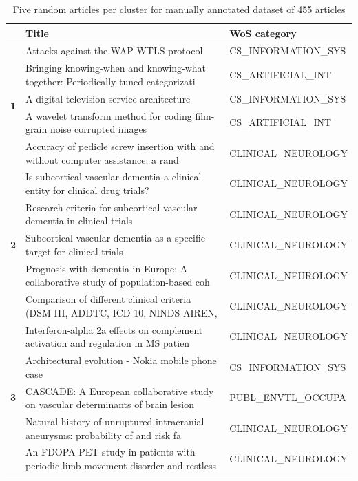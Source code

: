 \begin{table}
\begin{tabular}{|c|p{6.5cm}|p{4.7cm}|} 
\hline %
\textbf{ } & \textbf{Title} & \textbf{WoS category} \\ 
\hline 
\multirow{ 5}{*}{\textbf{1}} & Attacks against the WAP WTLS protocol & CS\_INFORMATION\_SYS \\
& Bringing knowing-when and knowing-what together: Periodically tuned categorizati & CS\_ARTIFICIAL\_INT  \\
& A digital television service architecture & CS\_INFORMATION\_SYS  \\ 
& A wavelet transform method for coding film-grain noise corrupted images & CS\_ARTIFICIAL\_INT  \\ 
& Accuracy of pedicle screw insertion with and without computer assistance: a rand & CLINICAL\_NEUROLOGY  \\
\hline
\hline 
\multirow{ 5}{*}{\textbf{2}} & Is subcortical vascular dementia a clinical entity for clinical drug trials? & CLINICAL\_NEUROLOGY \\
& Research criteria for subcortical vascular dementia in clinical trials & CLINICAL\_NEUROLOGY \\
& Subcortical vascular dementia as a specific target for clinical trials & CLINICAL\_NEUROLOGY \\ 
& Prognosis with dementia in Europe: A collaborative study of population-based coh & CLINICAL\_NEUROLOGY \\ 
& Comparison of different clinical criteria (DSM-III, ADDTC, ICD-10, NINDS-AIREN, & CLINICAL\_NEUROLOGY \\
\hline
\hline 
\multirow{ 5}{*}{\textbf{3}} & Interferon-alpha 2a effects on complement activation and regulation in MS patien & CLINICAL\_NEUROLOGY \\
& Architectural evolution - Nokia mobile phone case & CS\_INFORMATION\_SYS \\
& CASCADE: A European collaborative study on vascular determinants of brain lesion & PUBL\_ENVTL\_OCCUPA  \\ 
& Natural history of unruptured intracranial aneurysms: probability of and risk fa & CLINICAL\_NEUROLOGY \\ 
& An FDOPA PET study in patients with periodic limb movement disorder and restless & CLINICAL\_NEUROLOGY \\
\hline
\hline 
\end{tabular} %
\caption{Five random articles per cluster for manually annotated dataset of 455 articles}
\label{table:articles_455_hier}
\end{table} %



